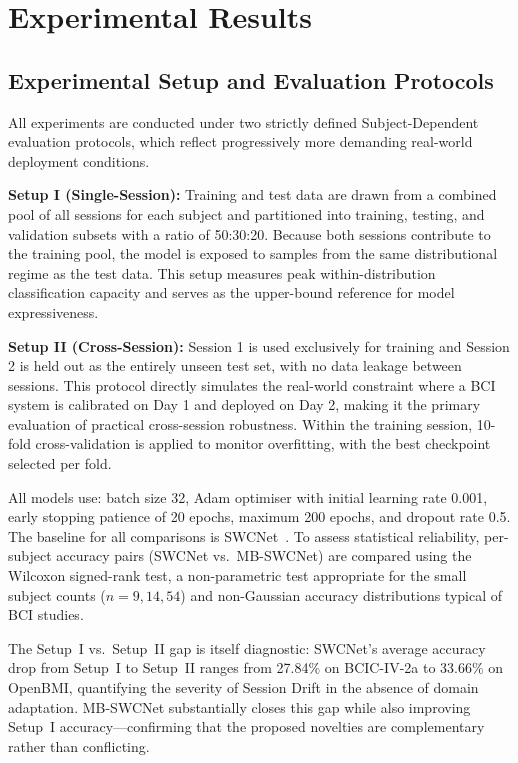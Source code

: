 \documentclass[conference]{IEEEtran}
\begin{document}
\section{Experimental Results}

\subsection{Experimental Setup and Evaluation Protocols}

All experiments are conducted under two strictly defined Subject-Dependent evaluation protocols, which reflect progressively more demanding real-world deployment conditions.

\textbf{Setup I (Single-Session):} Training and test data are drawn from a combined pool of all sessions for each subject and partitioned into training, testing, and validation subsets with a ratio of 50:30:20. Because both sessions contribute to the training pool, the model is exposed to samples from the same distributional regime as the test data. This setup measures peak within-distribution classification capacity and serves as the upper-bound reference for model expressiveness.

\textbf{Setup II (Cross-Session):} Session 1 is used exclusively for training and Session 2 is held out as the entirely unseen test set, with no data leakage between sessions. This protocol directly simulates the real-world constraint where a BCI system is calibrated on Day 1 and deployed on Day 2, making it the primary evaluation of practical cross-session robustness. Within the training session, 10-fold cross-validation is applied to monitor overfitting, with the best checkpoint selected per fold.

All models use: batch size 32, Adam optimiser with initial learning rate 0.001, early stopping patience of 20 epochs, maximum 200 epochs, and dropout rate 0.5. The baseline for all comparisons is SWCNet~\cite{b1}. To assess statistical reliability, per-subject accuracy pairs (SWCNet vs.\ MB-SWCNet) are compared using the Wilcoxon signed-rank test, a non-parametric test appropriate for the small subject counts ($n = 9, 14, 54$) and non-Gaussian accuracy distributions typical of BCI studies.

The Setup~I vs.\ Setup~II gap is itself diagnostic: SWCNet's average accuracy drop from Setup~I to Setup~II ranges from 27.84\% on BCIC-IV-2a to 33.66\% on OpenBMI, quantifying the severity of Session Drift in the absence of domain adaptation. MB-SWCNet substantially closes this gap while also improving Setup~I accuracy---confirming that the proposed novelties are complementary rather than conflicting.
\end{document}
